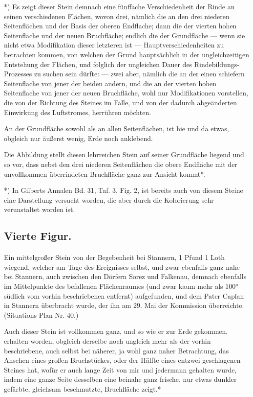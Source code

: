 \documentclass[a4paper, 11pt, oneside, german]{article}
\begin{document}
*) Es zeigt dieser Stein demnach eine fünffache Verschiedenheit der Rinde an seinen verschiedenen Flächen, wovon drei, nämlich die an den drei niederen Seitenflächen und der Basis der oberen Endflache; dann die der vierten hohen Seitenflache und der neuen Bruchfläche; endlich die der Grundfläche --- wenn sie nicht etwa Modifikation dieser letzteren ist --- Hauptverschiedenheiten zu betrachten kommen, von welchen der Grund hauptsächlich in der ungleichzeitigen Entstehung der Flächen, und folglich der ungleichen Dauer des Rindebildungs-Prozesses zu suchen sein dürfte: --- zwei aber, nämlich die an der einen schiefern Seitenflache von jener der beiden andern, und die an der vierten hohen Seitenflache von jener der neuen Bruchfläche, wohl nur Modifikationen vorstellen, die von der Richtung des Steines im Falle, und von der dadurch abgeänderten Einwirkung des Luftstromes, herrühren möchten.

An der Grundfläche sowohl als an allen Seitenflächen, ist hie und da etwas, obgleich nur äußerst wenig, Erde noch anklebend.

Die Abbildung stellt diesen lehrreichen Stein auf seiner Grundfläche liegend und so vor, dass nebst den drei niederen Seitenflächen die obere Endfläche mit der unvollkommen überrindeten Bruchfläche ganz zur Ansicht kommt*.

*) In Gilberts Annalen Bd. 31, Taf. 3, Fig. 2, ist bereits auch von diesem Steine eine Darstellung versucht worden, die aber durch die Kolorierung sehr verunstaltet worden ist.

\subsection{Vierte Figur.}
\paragraph{}
Ein mittelgroßer Stein von der Begebenheit bei Stannern, 1 Pfund 1 Loth wiegend, welcher am Tage des Ereignisses selbst, und zwar ebenfalls ganz nahe bei Stannern, auch zwischen den Dörfern Sorez und Falkenau, demnach ebenfalls im Mittelpunkte des befallenen Flächenraumes (und zwar kaum mehr als 100° südlich vom vorhin beschriebenen entfernt) aufgefunden, und dem Pater Caplan in Stannern überbracht wurde, der ihn am 29. Mai der Kommission überreichte. (Situations-Plan Nr. 40.)

Auch dieser Stein ist vollkommen ganz, und so wie er zur Erde gekommen, erhalten worden, obgleich derselbe noch ungleich mehr als der vorhin beschriebene, auch selbst bei näherer, ja wohl ganz naher Betrachtung, das Ansehen eines großen Bruchstückes, oder der Hälfte eines entzwei geschlagenen Steines hat, wofür er auch lange Zeit von mir und jedermann gehalten wurde, indem eine ganze Seite desselben eine beinahe ganz frische, nur etwas dunkler gefärbte, gleichsam beschmutzte, Bruchfläche zeigt.*
\end{document}
